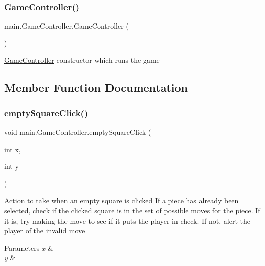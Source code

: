 \subsubsection{\texorpdfstring{Game\+Controller()}{GameController()}}
{\footnotesize\ttfamily main.\+Game\+Controller.\+Game\+Controller (\begin{DoxyParamCaption}{ }\end{DoxyParamCaption})}

\hyperlink{classmain_1_1_game_controller}{Game\+Controller} constructor which runs the game 

\subsection{Member Function Documentation}
\hypertarget{classmain_1_1_game_controller_a469b3da25d6a5ee02984379328262965}{}\label{classmain_1_1_game_controller_a469b3da25d6a5ee02984379328262965} 
\subsubsection{\texorpdfstring{empty\+Square\+Click()}{emptySquareClick()}}
{\footnotesize\ttfamily void main.\+Game\+Controller.\+empty\+Square\+Click (\begin{DoxyParamCaption}\item[{int}]{x,  }\item[{int}]{y }\end{DoxyParamCaption})}

Action to take when an empty square is clicked If a piece has already been selected, check if the clicked square is in the set of possible moves for the piece. If it is, try making the move to see if it puts the player in check. If not, alert the player of the invalid move 
\begin{DoxyParams}{Parameters}
{\em x} & \\
\hline
{\em y} & \\
\hline
\end{DoxyParams}
\hypertarget{classmain_1_1_game_controller_acd8e5da713b1029f841ddd7fe9b54d0d}{}\label{classmain_1_1_game_controller_acd8e5da713b1029f841ddd7fe9b54d0d} 
